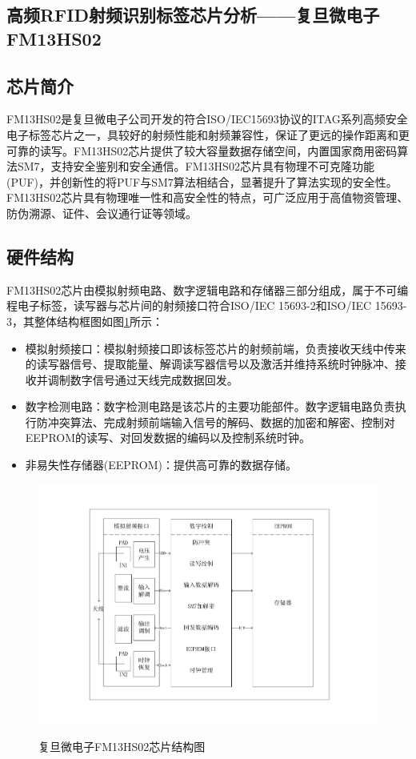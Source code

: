 \documentclass[a4paper]{ctexart}
\begin{document}
\begin{spacing}{1.5}
\section{高频RFID射频识别标签芯片分析——复旦微电子FM13HS02}
\subsection{芯片简介}
FM13HS02是复旦微电子公司开发的符合ISO/IEC15693协议的ITAG系列高频安全电子标签芯片之一，具较好的射频性能和射频兼容性，保证了更远的操作距离和更可靠的读写。FM13HS02芯片提供了较大容量数据存储空间，内置国家商用密码算法SM7，支持安全鉴别和安全通信。FM13HS02芯片具有物理不可克隆功能(PUF)，并创新性的将PUF与SM7算法相结合，显著提升了算法实现的安全性。FM13HS02芯片具有物理唯一性和高安全性的特点，可广泛应用于高值物资管理、防伪溯源、证件、会议通行证等领域。

\subsection{硬件结构}
FM13HS02芯片由模拟射频电路、数字逻辑电路和存储器三部分组成，属于不可编程电子标签，读写器与芯片间的射频接口符合ISO/IEC 15693-2和ISO/IEC 15693-3，其整体结构框图如图\ref{f1}所示：
\begin{itemize}
	\item 模拟射频接口：模拟射频接口即该标签芯片的射频前端，负责接收天线中传来的读写器信号、提取能量、解调读写器信号以及激活并维持系统时钟脉冲、接收并调制数字信号通过天线完成数据回发。
	\item 数字检测电路：数字检测电路是该芯片的主要功能部件。数字逻辑电路负责执行防冲突算法、完成射频前端输入信号的解码、数据的加密和解密、控制对EEPROM的读写、对回发数据的编码以及控制系统时钟。
	\item 非易失性存储器(EEPROM)：提供高可靠的数据存储。
\end{itemize}

\begin{figure}
	\centering
	\includegraphics[width=\textwidth, keepaspectratio]{figure/RFID2.pdf}\\
	\caption{复旦微电子FM13HS02芯片结构图}\label{f1}
\end{figure}

\end{spacing}
\end{document}
